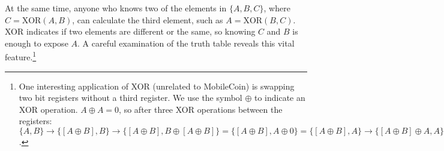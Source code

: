 At the same time, anyone who knows two of the elements in $\{A,B,C\}$, where $C = \text{XOR}(A,B)$, can calculate the third element, such as $A = \text{XOR}(B,C)$. XOR indicates if two elements are different or the same, so knowing $C$ and $B$ is enough to expose $A$. A careful examination of the truth table reveals this vital feature.\footnote{One interesting application of XOR (unrelated to MobileCoin) is swapping two bit registers without a third register. We use the symbol $\oplus$ to indicate an XOR operation. $A \oplus A = 0$, so after three XOR operations between the registers: $\{A, B\} \rightarrow{} \{[A \oplus B], B\} \rightarrow{} \{[A \oplus B], B \oplus [A \oplus B]\} = \{[A \oplus B], A \oplus 0\} = \{[A \oplus B], A\} \rightarrow{} \{[A \oplus B] \oplus A, A\} = \{B, A\}$.}